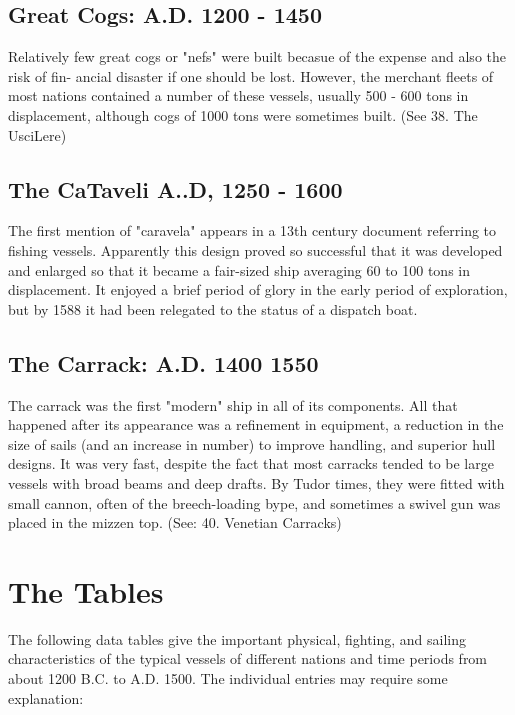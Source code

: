 \documentclass{article}
\begin{document}
\begin{multicols}{2}
\subsection{Great Cogs:  A.D. 1200 - 1450}

Relatively few great cogs or "nefs" were built becasue of the expense
and also the risk of fin- ancial disaster if one should be lost.
However, the merchant fleets of most nations contained a number of
these vessels, usually 500 - 600 tons in displacement, although cogs
of 1000 tons were sometimes built.  (See 38.  The UsciLere)

\subsection{The CaTaveli  A..D, 1250 - 1600}

The first mention of "caravela" appears in a 13th century document
referring to fishing vessels.  Apparently this design proved so
successful that it was developed and enlarged so that it became a
fair-sized ship averaging 60 to 100 tons in displacement.  It enjoyed
a brief period of glory in the early period of exploration, but by
1588 it had been relegated to the status of a dispatch boat.

\subsection{The Carrack:  A.D. 1400    1550}

The carrack was the first "modern" ship in all of its components. All
that happened after its appearance was a refinement in equipment, a
reduction in the size of sails (and an increase in number) to improve
handling, and superior hull designs.  It was very fast, despite the
fact that most carracks tended to be large vessels with broad beams
and deep drafts.  By Tudor times, they were fitted with small cannon,
often of the breech-loading bype, and sometimes a swivel gun was
placed in the mizzen top.  (See: 40.  Venetian Carracks)

\end{multicols}

\section{The Tables}

The following data tables give the important physical, fighting, and
sailing characteristics of the typical vessels of different nations
and time periods from about 1200 B.C. to A.D. 1500.  The individual
entries may require some explanation:
\end{document}
